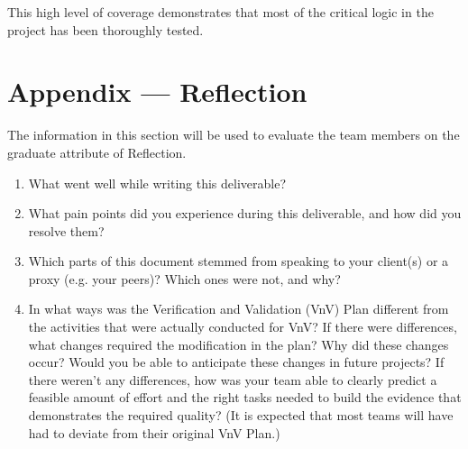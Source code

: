 \documentclass[12pt, titlepage]{article}
\begin{document}
This high level of coverage demonstrates that most of the critical logic in the
project has been thoroughly tested.




\newpage{}
\section*{Appendix --- Reflection}

The information in this section will be used to evaluate the team members on the
graduate attribute of Reflection.



\begin{enumerate}
  \item What went well while writing this deliverable? 
  \item What pain points did you experience during this deliverable, and how did
    you resolve them?
  \item Which parts of this document stemmed from speaking to your client(s) or
  a proxy (e.g. your peers)? Which ones were not, and why?
  \item In what ways was the Verification and Validation (VnV) Plan different
  from the activities that were actually conducted for VnV?  If there were
  differences, what changes required the modification in the plan?  Why did
  these changes occur?  Would you be able to anticipate these changes in future
  projects?  If there weren't any differences, how was your team able to clearly
  predict a feasible amount of effort and the right tasks needed to build the
  evidence that demonstrates the required quality?  (It is expected that most
  teams will have had to deviate from their original VnV Plan.)
\end{enumerate}
\end{document}
